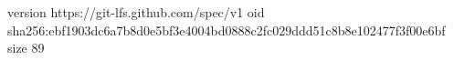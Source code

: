 version https://git-lfs.github.com/spec/v1
oid sha256:ebf1903dc6a7b8d0e5bf3e4004bd0888c2fc029ddd51c8b8e102477f3f00e6bf
size 89
